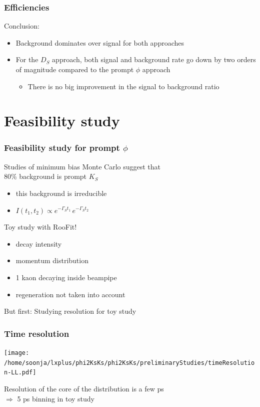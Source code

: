 \documentclass{beamer}
\begin{document}
\begin{frame}
\frametitle{Efficiencies}
Conclusion:
\begin{itemize}
\item Background dominates over signal for both approaches
\item For the $D_S$ approach, both signal and background rate go down by two orders of magnitude compared to the prompt $\phi$ approach
\begin{itemize}
\item There is no big improvement in the signal to background ratio
\end{itemize}
\end{itemize}

\end{frame}







\section{Feasibility study}





\LogoOff
\begin{frame}[fragile]
\frametitle{Feasibility study for prompt $\phi$}

Studies of minimum bias Monte Carlo suggest that \\80\% background is prompt $K_S$
\begin{itemize}
\item this background is irreducible
\item $I(t_1,t_2) \propto e^{-\Gamma_St_1} \,e^{-\Gamma_St_2}$
\end{itemize}
\vspace*{6pt}
Toy study with RooFit!
\begin{itemize}
\item decay intensity
\item momentum distribution
\item 1 kaon decaying inside beampipe
\item regeneration not taken into account
\end{itemize}
\vspace*{6pt}
But first: Studying resolution for toy study
\end{frame}

\begin{frame}
\frametitle{Time resolution}
\vspace*{-4mm}
\begin{center}
\texttt{[image: /home/soonja/lxplus/phi2KsKs/phi2KsKs/preliminaryStudies/timeResolution-LL.pdf]}
\end{center}
\vspace*{-4mm}
Resolution of the core of the distribution is a few ps\\
$\Rightarrow$ 5 ps binning in toy study
\end{frame}
\end{document}
